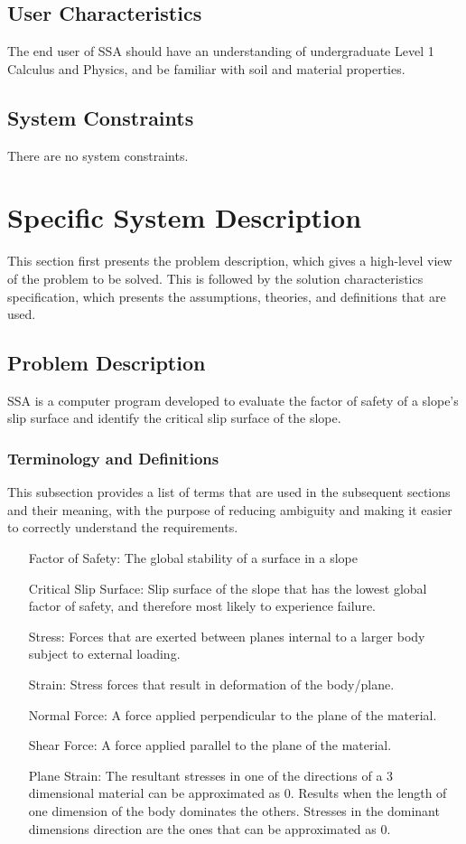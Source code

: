 \documentclass[12pt]{article}
\begin{document}
\subsection{User Characteristics}
\label{Sec:UserChars}
The end user of SSA should have an understanding of undergraduate Level 1 Calculus and Physics, and be familiar with soil and material properties.
\subsection{System Constraints}
\label{Sec:SysConstraints}
There are no system constraints.
\section{Specific System Description}
\label{Sec:SpecSystDesc}
This section first presents the problem description, which gives a high-level view of the problem to be solved. This is followed by the solution characteristics specification, which presents the assumptions, theories, and definitions that are used.
\subsection{Problem Description}
\label{Sec:ProbDesc}
SSA is a computer program developed to evaluate the factor of safety of a slope's slip surface and identify the critical slip surface of the slope.
\subsubsection{Terminology and Definitions}
\label{Sec:TermDefs}
This subsection provides a list of terms that are used in the subsequent sections and their meaning, with the purpose of reducing ambiguity and making it easier to correctly understand the requirements.
\begin{itemize}
\item[Factor of Safety:]The global stability of a surface in a slope
\item[Critical Slip Surface:]Slip surface of the slope that has the lowest global factor of safety, and therefore most likely to experience failure.
\item[Stress:]Forces that are exerted between planes internal to a larger body subject to external loading.
\item[Strain:]Stress forces that result in deformation of the body/plane.
\item[Normal Force:]A force applied perpendicular to the plane of the material.
\item[Shear Force:]A force applied parallel to the plane of the material.
\item[Plane Strain:]The resultant stresses in one of the directions of a 3 dimensional material can be approximated as 0. Results when the length of one dimension of the body dominates the others. Stresses in the dominant dimensions direction are the ones that can be approximated as 0.
\end{itemize}
\end{document}
